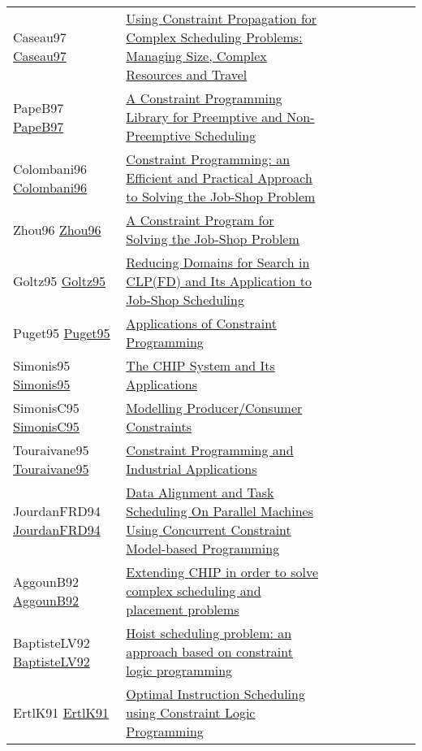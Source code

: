 {\begin{longtable}{p{3cm}p{7cm}lllllll}
Caseau97 \href{https://doi.org/10.1007/BFb0017437}{Caseau97} &  \href{papers/Caseau97.pdf}{Using Constraint Propagation for Complex Scheduling Problems: Managing Size, Complex Resources and Travel} &  &  &  &  &  &  & \\
PapeB97 \href{}{PapeB97} &  \href{papers/PapeB97.pdf}{A Constraint Programming Library for Preemptive and Non-Preemptive Scheduling} &  &  &  &  &  &  & \\
Colombani96 \href{https://doi.org/10.1007/3-540-61551-2\_72}{Colombani96} &  \href{papers/Colombani96.pdf}{Constraint Programming: an Efficient and Practical Approach to Solving the Job-Shop Problem} &  &  &  &  &  &  & \\
Zhou96 \href{https://doi.org/10.1007/3-540-61551-2\_97}{Zhou96} &  \href{papers/Zhou96.pdf}{A Constraint Program for Solving the Job-Shop Problem} &  &  &  &  &  &  & \\
Goltz95 \href{https://doi.org/10.1007/3-540-60299-2\_33}{Goltz95} &  \href{papers/Goltz95.pdf}{Reducing Domains for Search in {CLP(FD)} and Its Application to Job-Shop Scheduling} &  &  &  &  &  &  & \\
Puget95 \href{https://doi.org/10.1007/3-540-60299-2\_43}{Puget95} &  \href{papers/Puget95.pdf}{Applications of Constraint Programming} &  &  &  &  &  &  & \\
Simonis95 \href{https://doi.org/10.1007/3-540-60299-2\_42}{Simonis95} &  \href{papers/Simonis95.pdf}{The {CHIP} System and Its Applications} &  &  &  &  &  &  & \\
SimonisC95 \href{https://doi.org/10.1007/3-540-60299-2\_27}{SimonisC95} &  \href{papers/SimonisC95.pdf}{Modelling Producer/Consumer Constraints} &  &  &  &  &  &  & \\
Touraivane95 \href{https://doi.org/10.1007/3-540-60299-2\_41}{Touraivane95} &  \href{papers/Touraivane95.pdf}{Constraint Programming and Industrial Applications} &  &  &  &  &  &  & \\
JourdanFRD94 \href{}{JourdanFRD94} &  \href{papers/JourdanFRD94.pdf}{Data Alignment and Task Scheduling On Parallel Machines Using Concurrent Constraint Model-based Programming} &  &  &  &  &  &  & \\
AggounB92 \href{}{AggounB92} &  \href{papers/AggounB92.pdf}{Extending {CHIP} in order to solve complex scheduling and placement problems} &  &  &  &  &  &  & \\
BaptisteLV92 \href{https://doi.org/10.1109/ROBOT.1992.220195}{BaptisteLV92} &  \href{papers/BaptisteLV92.pdf}{Hoist scheduling problem: an approach based on constraint logic programming} &  &  &  &  &  &  & \\
ErtlK91 \href{https://doi.org/10.1007/3-540-54444-5\_89}{ErtlK91} &  \href{papers/ErtlK91.pdf}{Optimal Instruction Scheduling using Constraint Logic Programming} &  &  &  &  &  &  & \\
\end{longtable}
}

